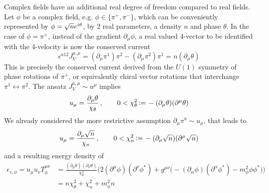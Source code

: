Complex fields have an additional real degree of freedom compared to real fields. Let $\phi$ be a complex field, e.g. $\phi\in\{\pi^+,\pi^-\}$, which can be conveniently represented by ${\phi=\sqrt{n}e^{{i}\theta}}$, by 2 real parameters, a density $n$ and phase $\theta$. In the case of ${\phi=\pi^+}$, instead of the gradient ${\partial_\mu\phi}$, a real valued 4-vector to be identified with the 4-velocity is now the conserved current
\begin{equation}
    \epsilon^{a12}J_V^{a,\mu}=(\partial_\mu\pi^1)\pi^2-(\partial_\mu\pi^2)\pi^1=n(\partial_\mu\theta)
\end{equation}
This is precisely the conserved current derived from the $U(1)$ symmetry of phase rotations of $\pi^+$, or equivalently chiral vector rotations that interchange ${\pi^1\leftrightarrow\pi^2}$. The ansatz ${J_V^{a,\mu}\sim u^\mu}$ implies
\begin{equation}
    u_\mu=\frac{\partial_\mu\theta}{\chi_\theta}\,,\qquad 0<\chi_\theta^2{\,\vcentcolon=\,}-(\partial_\mu\theta)(\partial^\mu\theta)
\end{equation}
We already considered the more restrictive assumption ${\partial_\mu\pi^a\sim u_\mu}$, that leads to 
\begin{equation}
    u_\mu=\frac{\partial_\mu\sqrt{n}}{\chi_n}\,,\qquad 0<\chi_n^2{\,\vcentcolon=\,}-(\partial_\mu\sqrt{n})(\partial^\mu\sqrt{n})
\end{equation}
and a resulting energy density of
\begin{subequations}
    \begin{align}
        \epsilon_{s,\phi}=u_\mu u_\nu T^{\mu\nu}_{\phi}&=\frac{(\partial_\mu\theta)(\partial_\nu\theta)}{\chi_\theta^2}\Big(2(\partial^\mu\phi)(\partial^\nu\phi^*)+g^{\mu\nu}\big(-(\partial_\alpha\phi)(\partial^\alpha\phi^*)-m_\phi^2\phi\phi^*\big)\Big)\\
        &=n\chi_\theta^2+\chi^2_n+m_\phi^2n
    \end{align}
\end{subequations}
